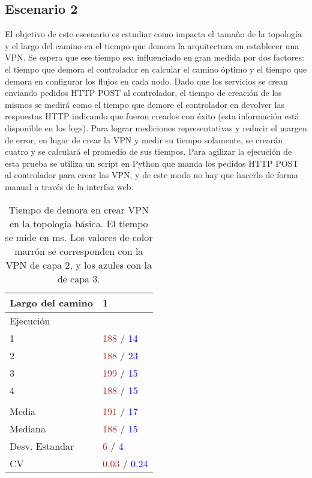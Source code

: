 \subsection{Escenario 2}
El objetivo de este escenario es estudiar como impacta el tamaño de la topología y el largo del camino en el tiempo que demora la arquitectura en establecer una VPN. Se espera que ese tiempo sea influenciado en gran medida por dos factores: el tiempo que demora el controlador en calcular el camino óptimo y el tiempo que demora en configurar los flujos en cada nodo. Dado que los servicios se crean enviando pedidos HTTP POST al controlador, el tiempo de creación de los mismos se medirá como el tiempo que demore el controlador en devolver las respuestas HTTP indicando que fueron creados con éxito (esta información está disponible en los logs). Para lograr mediciones representativas y reducir el margen de error, en lugar de crear la VPN y medir su tiempo solamente, se crearán cuatro y se calculará el promedio de sus tiempos. Para agilizar la ejecución de esta prueba se utiliza un script en Python que manda los pedidos HTTP POST al controlador para crear las VPN, y de este modo no hay que hacerlo de forma manual a través de la interfaz web.

\newcommand{\vpncd}{\textcolor{blue}[1]}

\newcommand{\vpnct}{\textcolor{green}[1]}

\begin{table}[ht]
	\caption{Tiempo de demora en crear VPN en la topología básica. El tiempo se mide en ms. Los valores de color marrón se corresponden con la VPN de capa 2, y los azules con la de capa 3.}
	\centering 
	\begin{tabular}{p{3.2cm} p{1.8cm}}
		\hline
		Largo del camino & 1 \\ [0.5ex]
		\hline
		Ejecución & \\
		1 & \textcolor{brown}{188} / \textcolor{blue}{14} \\
		2 & \textcolor{brown}{188} / \textcolor{blue}{23} \\
		3 & \textcolor{brown}{199} / \textcolor{blue}{15} \\
		4 & \textcolor{brown}{188} / \textcolor{blue}{15} \\
		& \\
		Media & \textcolor{brown}{191} / \textcolor{blue}{17} \\
		Mediana & \textcolor{brown}{188} / \textcolor{blue}{15} \\
		Desv. Estandar & \textcolor{brown}{6} / \textcolor{blue}{4} \\
		CV & \textcolor{brown}{0.03} / \textcolor{blue}{0.24} \\ [1ex]
		\hline
	\end{tabular}
	\label{table:tiempo_topo_basica}
\end{table}


